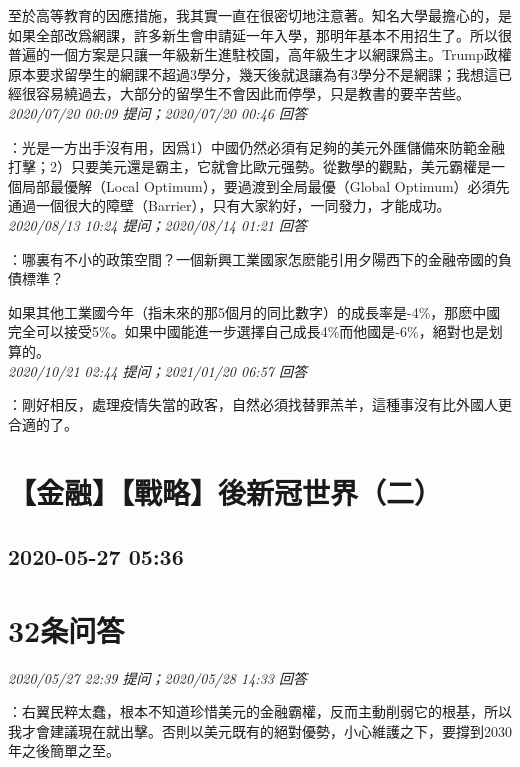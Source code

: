 \documentclass[twocolumn]{ctexart}
\begin{document}
至於高等教育的因應措施，我其實一直在很密切地注意著。知名大學最擔心的，是如果全部改爲網課，許多新生會申請延一年入學，那明年基本不用招生了。所以很普遍的一個方案是只讓一年級新生進駐校園，高年級生才以網課爲主。Trump政權原本要求留學生的網課不超過3學分，幾天後就退讓為有3學分不是網課；我想這已經很容易繞過去，大部分的留學生不會因此而停學，只是教書的要辛苦些。
\\

\textit{\hfill\noindent\small 2020/07/20 00:09 提问；2020/07/20 00:46 回答}

：光是一方出手沒有用，因爲1）中國仍然必須有足夠的美元外匯儲備來防範金融打擊；2）只要美元還是霸主，它就會比歐元强勢。從數學的觀點，美元霸權是一個局部最優解（Local Optimum），要過渡到全局最優（Global Optimum）必須先通過一個很大的障壁（Barrier），只有大家約好，一同發力，才能成功。
\\

\textit{\hfill\noindent\small 2020/08/13 10:24 提问；2020/08/14 01:21 回答}

：哪裏有不小的政策空間？一個新興工業國家怎麽能引用夕陽西下的金融帝國的負債標準？

如果其他工業國今年（指未來的那5個月的同比數字）的成長率是-4\%，那麽中國完全可以接受5\%。如果中國能進一步選擇自己成長4\%而他國是-6\%，絕對也是划算的。
\\

\textit{\hfill\noindent\small 2020/10/21 02:44 提问；2021/01/20 06:57 回答}

：剛好相反，處理疫情失當的政客，自然必須找替罪羔羊，這種事沒有比外國人更合適的了。
\\


\section{【金融】【戰略】後新冠世界（二）}
\subsection{2020-05-27 05:36}


\section{32条问答}

\textit{\hfill\noindent\small 2020/05/27 22:39 提问；2020/05/28 14:33 回答}

：右翼民粹太蠢，根本不知道珍惜美元的金融霸權，反而主動削弱它的根基，所以我才會建議現在就出擊。否則以美元既有的絕對優勢，小心維護之下，要撐到2030年之後簡單之至。
\\
\end{document}
